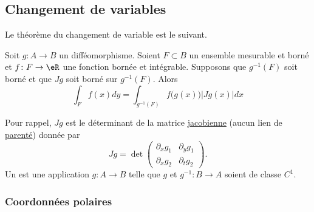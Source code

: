 \subsection{Changement de variables}


Le théorème du changement de variable est le suivant.
\begin{theorem}
Soit $g\colon A\to B$ un difféomorphisme. Soient $F\subset B$ un ensemble mesurable et borné et $f\colon F\to \eR$ une fonction bornée et intégrable. Supposons que $g^{-1}(F)$ soit borné et que $Jg$ soit borné sur $g^{-1}(F)$. Alors
\begin{equation}
    \int_Ff(x)dy=\int_{g^{-1}(F)}f\big( g(x) \big)| Jg(x) |dx
\end{equation}
\end{theorem}
Pour rappel, $Jg$ est le déterminant de la matrice \href{http://fr.wikipedia.org/wiki/Matrice_jacobienne}{jacobienne} (aucun lien de \href{http://fr.wikipedia.org/wiki/Jacob}{parenté}) donnée par
\begin{equation}
	Jg=\det\begin{pmatrix}
	\partial_xg_1	&	\partial_yg_1	\\ 
	\partial_xg_2	&	\partial_tg_2	
\end{pmatrix}.
\end{equation}
Un  est une application $g\colon A\to B$ telle que $g$ et $g^{-1}\colon B\to A$ soient de classe $C^1$.

					\subsubsection{Coordonnées polaires}

